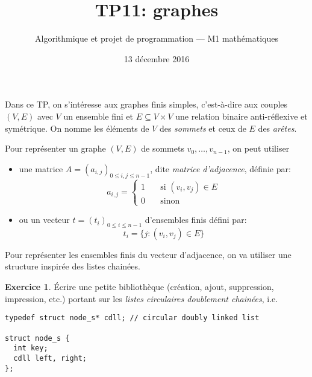 \documentclass[french,a4paper]{article}
\title{\sffamily TP11: graphes}%
\date{13 décembre 2016}%
\author{Algorithmique et projet de programmation --- M1
  mathématiques}%
\theoremstyle{definition}
\newtheorem{exercise}{Exercice}
\theoremstyle{remark}
\begin{document}
\maketitle

Dans ce TP, on s'intéresse aux graphes finis simples, c'est-à-dire aux
couples $(V,E)$ avec $V$ un ensemble fini et $E \subseteq V\times V$
une relation binaire anti-réflexive et symétrique. On nomme les
éléments de $V$ des {\em sommets} et ceux de $E$ des {\em arêtes}.

Pour représenter un graphe $(V,E)$ de sommets $v_0,\dots,v_{n-1}$, on
peut utiliser
\begin{itemize}
\item une matrice $A = (a_{i,j})_{0\leq i,j\leq n-1}$, dite
  {\em matrice d'adjacence}, définie par:
  \begin{displaymath}
    a_{i,j} = 
    \left\{
      \begin{aligned}
        1 \quad &\text{si } (v_i,v_j) \in E\\
        0 \quad &\text{sinon}
      \end{aligned}
    \right.
  \end{displaymath}
\item ou un vecteur $t = (t_i)_{0\leq i \leq n-1}$ d'ensembles finis
  défini par:
  \begin{displaymath}
    t_i = \{ j : (v_i,v_j) \in E \}
  \end{displaymath}
\end{itemize}

Pour représenter les ensembles finis du vecteur d'adjacence, on va
utiliser une structure inspirée des listes chainées.
\begin{exercise}
  \'Ecrire une petite bibliothèque (création, ajout, suppression,
  impression, etc.) portant sur les {\em listes circulaires doublement
    chainées}, i.e.
\begin{lstlisting}
typedef struct node_s* cdll; // circular doubly linked list

struct node_s {
  int key;
  cdll left, right;
};
\end{lstlisting}
\end{exercise}
\end{document}
